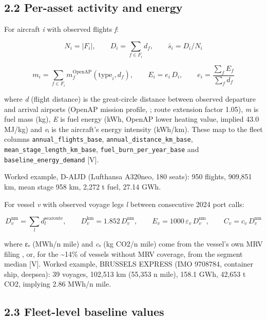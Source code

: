 \documentclass[11pt,a4paper]{article}
\begin{document}
\subsection*{2.2 Per-asset activity and energy}

For aircraft \emph{i} with observed flights \emph{f}:

\[
N_i = |F_i|, \qquad D_i = \sum_{f \in F_i} d_f, \qquad \bar{s}_i = D_i / N_i
\]

\[
m_i = \sum_{f \in F_i} m_f^{\mathrm{OpenAP}}(\mathrm{type}_i, d_f), \qquad E_i = e_i \, D_i, \qquad e_i = \frac{\sum_f E_f}{\sum_f d_f}
\]

where \emph{d} (flight distance) is the great-circle distance between observed departure and arrival airports (OpenAP mission profile, \citealp{sun2020}; route extension factor 1.05), \emph{m} is fuel mass (kg), \emph{E} is fuel energy (kWh, OpenAP lower heating value, implied 43.0 MJ/kg) and \emph{e}ᵢ is the aircraft's energy intensity (kWh/km). These map to the fleet columns \texttt{annual\_\allowbreak{}flights\_\allowbreak{}base}, \texttt{annual\_\allowbreak{}distance\_\allowbreak{}km\_\allowbreak{}base}, \texttt{mean\_\allowbreak{}stage\_\allowbreak{}length\_\allowbreak{}km\_\allowbreak{}base}, \texttt{fuel\_\allowbreak{}burn\_\allowbreak{}per\_\allowbreak{}year\_\allowbreak{}base} and \texttt{baseline\_\allowbreak{}energy\_\allowbreak{}demand} [V].

Worked example, D-AIJD (Lufthansa A320neo, 180 seats): 950 flights, 909,851 km, mean stage 958 km, 2,272 t fuel, 27.14 GWh.

For vessel \emph{v} with observed voyage legs \emph{l} between consecutive 2024 port calls:

\[
D_v^{\mathrm{nm}} = \sum_{l} d_l^{\mathrm{searoute}}, \qquad D_v^{\mathrm{km}} = 1.852 \, D_v^{\mathrm{nm}}, \qquad E_v = 1000 \, \varepsilon_v \, D_v^{\mathrm{nm}}, \qquad C_v = c_v \, D_v^{\mathrm{nm}}
\]

where εᵥ (MWh/n mile) and \emph{c}ᵥ (kg CO2/n mile) come from the vessel's own MRV filing \citep{emsa}, or, for the \textasciitilde{}14\% of vessels without MRV coverage, from the segment median [V]. Worked example, BRUSSELS EXPRESS (IMO 9708784, container ship, deepsea): 39 voyages, 102,513 km (55,353 n mile), 158.1 GWh, 42,653 t CO2, implying 2.86 MWh/n mile.

\subsection*{2.3 Fleet-level baseline values}
\end{document}
